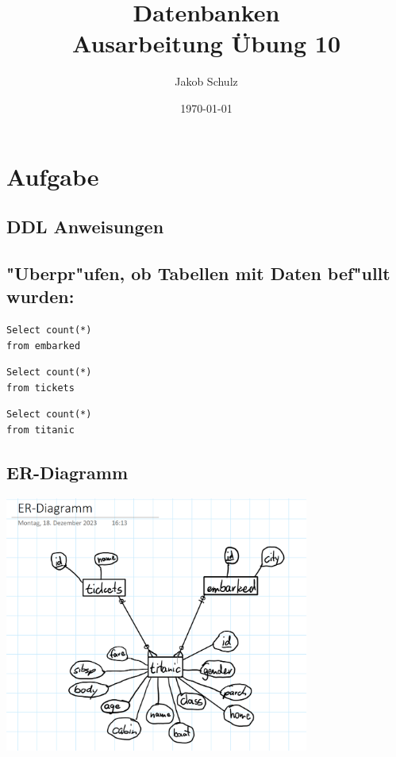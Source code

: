 \documentclass[a4paper, 11pt, titlepage]{article}
\begin{document}
\title{Datenbanken \\
Ausarbeitung \"Ubung 10}

\author{Jakob Schulz}

\date{\today}

\maketitle{\thispagestyle{plain}}

\section{Aufgabe}
\subsection{DDL Anweisungen}

\subsection{"Uberpr"ufen, ob Tabellen mit Daten bef"ullt wurden:}
\begin{lstlisting}[style = sql]
Select count(*)
from embarked
\end{lstlisting}
\begin{lstlisting}[style = sql]
Select count(*)
from tickets
\end{lstlisting}
\begin{lstlisting}[style = sql]
Select count(*)
from titanic
\end{lstlisting}
\subsection{ER-Diagramm}
\includegraphics[width = 10cm]{ER-Diagramm.png}
\end{document}
